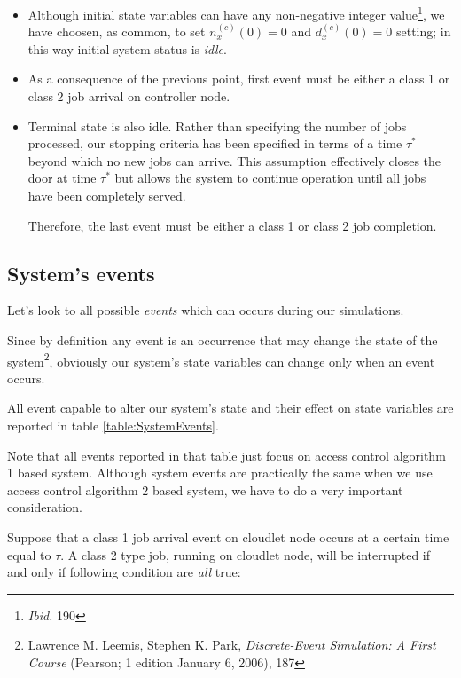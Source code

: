 \documentclass[10pt,a4paper]{article}
\begin{document}
\begin{itemize}
\item Although initial state variables can have any non-negative integer value\footnote{\textit{Ibid.} 190}, we have choosen, as common, to set $n_x^{(c)}(0) = 0$ and $d_x^{(c)}(0) = 0$ setting; in this way initial system status is \textit{idle}. 

\item As a consequence of the previous point, first event must be either a class 1 or class 2 job arrival on controller node.

\item Terminal state is also idle. Rather than specifying the number of jobs processed, our stopping criteria has been specified in terms of a time $\tau^*$ beyond which no new jobs can arrive. This assumption effectively closes the door at time $\tau^*$ but allows the system to continue operation until all jobs have been completely served. 

Therefore, the last event must be either a class 1 or class 2 job completion.
\end{itemize}


\subsection{System's events}

Let's look to all possible \textit{events} which can occurs during our simulations. 

Since by definition any event is an occurrence that may change the state of the system\footnote{Lawrence M. Leemis, Stephen K. Park, \textit{Discrete-Event Simulation: A First Course} (Pearson; 1 edition January 6, 2006), 187}, obviously our system's state variables can change only when an event occurs.

All event capable to alter our system's state and their effect on state variables are reported in table \ref{table:SystemEvents}.

Note that all events reported in that table just focus on access control algorithm 1 based system. Although system events are practically the same when we use access control algorithm 2 based system, we have to do a very important consideration.

Suppose that a class 1 job arrival event on cloudlet node occurs at a certain time equal to $\tau$. A class 2 type job, running on cloudlet node, will be interrupted if and only if following condition are \textit{all} true:
\end{document}
